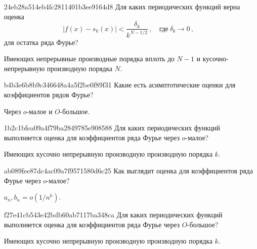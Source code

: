 \begin{note}{24eb28a514eb4fc2811401b3ee9164d8}
    Для каких периодических функций верна оценка
    \[
        \left\lvert f(x) - s_k(x) \right\rvert < \frac{\delta_k}{k^{N - 1/2}}\,, \quad \text{где}\ \delta_k \to 0\,,
    \]
    для остатка ряда Фурье?

    \begin{cloze}{1}
        Имеющих непрерывные производные порядка вплоть до \({ N - 1 }\) и кусочно-непрерывную производную порядка \({ N }\).
    \end{cloze}
\end{note}

\begin{note}{b4b3e6b8b9c346648a4a5f2be0f89f31}
    Какие есть асимптотические оценки для коэффициентов рядов Фурье?

    \begin{cloze}{1}
        Через \({ o }\)-малое и \({ O }\)-большое.
    \end{cloze}
\end{note}

\begin{note}{1b2c1bfea09a4f79ba2849785e908588}
    Для каких периодических функций выполняется оценка для коэффициентов ряда Фурье через \({ o }\)-малое?

    \begin{cloze}{1}
        Имеющих кусочно непрерывную производную производную порядка \({ k }\).
    \end{cloze}
\end{note}

\begin{note}{ab089fee87dc4ac09a7f9571580d6c25}
    Как выглядит оценка для коэффициентов ряда Фурье через \({ o }\)-малое?

    \begin{cloze}{1}
        \({ a_n, b_n = o(1/n^{k}) }\).
    \end{cloze}
\end{note}

\begin{note}{f27e41cb543e42bdb60ab7117ba348ca}
    Для каких периодических функций выполняется оценка для коэффициентов ряда Фурье через \({ O }\)-большое?

    \begin{cloze}{1}
        Имеющих кусочно непрерывную производную производную порядка \({ k }\).
    \end{cloze}
\end{note}

